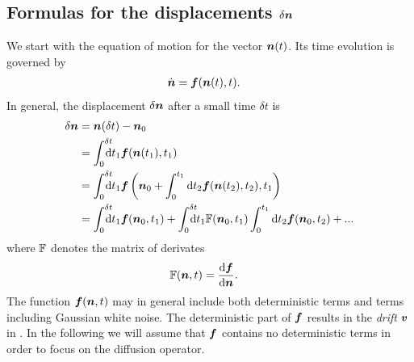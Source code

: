 \documentclass[thesis.tex]{subfiles}
\begin{document}
\subsection{Formulas for the displacements $\delta \mbox{\boldmath$n$}$}
We start with the equation of motion for the vector $\mbox{\boldmath$n$}(t)$. Its time evolution is governed by 
\begin{align*}
	\dot {\mbox{\boldmath$n$}} &= \mbox{\boldmath$f$}(\mbox{\boldmath$n$}(t), t).
\end{align*}
In general, the displacement $\delta \mbox{\boldmath$n$}$ after a small time $\delta t$ is
\begin{align}
	\delta \ve n &= \ve n(\delta t) - \ve n_0 \nn\\
	&= \int_0^{\delta t}\!\!\!\!\!\rd t_1 \ve f (\ve n(t_1 ), t_1)\nn\\
	&= \int_0^{\delta t}\!\!\!\!\!\rd t_1 \ve f\left(\ve n_0 + \int_0^{t_1}\rd t_2 \ve f(\ve n(t_2),t_2), t_1\right)\nn\\
	&= \int_0^{\delta t}\!\!\!\!\!\rd t_1 \ve f (\ve n_0, t_1)+\int_0^{\delta t}\!\!\!\!\!\rd t_1 \ma F (\ve n_0, t_1)\int_0^{t_1}\rd t_2 \ve f(\ve n_0, t_2) + ...\eqnlab{deltan}
\end{align}
where $\mathbb{F}$ denotes the matrix of derivates
\begin{align*}
	\mathbb{F}(\mbox{\boldmath$n$}, t) &= \frac{\mathrm{d} \mbox{\boldmath$f$}}{\mathrm{d} \mbox{\boldmath$n$}}.
\end{align*}
The function $\mbox{\boldmath$f$}(\mbox{\boldmath$n$}, t)$ may in general include both deterministic terms and terms including Gaussian white noise. The deterministic part of $\mbox{\boldmath$f$}$ results in the \emph{drift} $\mbox{\boldmath$v$}$ in . In the following we will assume that $\mbox{\boldmath$f$}$ contains no deterministic terms in order to focus on the diffusion operator.
\end{document}
